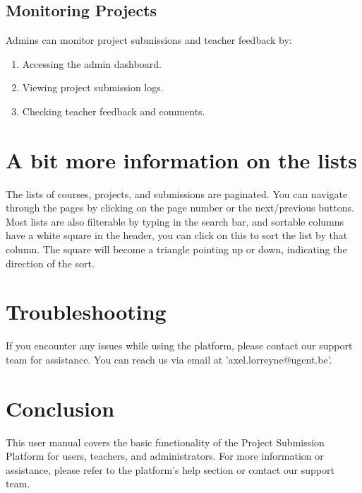 \documentclass{article}
\begin{document}
\subsection{Monitoring Projects}
Admins can monitor project submissions and teacher feedback by:
\begin{enumerate}
    \item Accessing the admin dashboard.
    \item Viewing project submission logs.
    \item Checking teacher feedback and comments.
\end{enumerate}


\section{A bit more information on the lists}
The lists of courses, projects, and submissions are paginated. You can navigate through the pages by clicking on the page number or the next/previous buttons.
Most lists are also filterable by typing in the search bar, and sortable columns have a white square in the header, you can click on this to sort the list by that column.
The square will become a triangle pointing up or down, indicating the direction of the sort.

\section{Troubleshooting}
If you encounter any issues while using the platform, please contact our support team for assistance. You can reach us via email at 'axel.lorreyne@ugent.be'.

\section{Conclusion}
This user manual covers the basic functionality of the Project Submission Platform for users, teachers, and administrators. For more information or assistance, please refer to the platform's help section or contact our support team.
\end{document}
